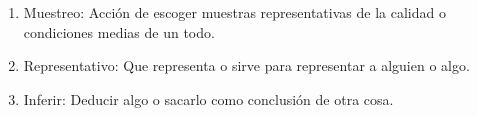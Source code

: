 \begin{enumerate}
    \item Muestreo: Acción de escoger muestras representativas de la calidad o condiciones medias de un todo.
    \cite{westreicher_2021}


    \item Representativo: Que representa o sirve para representar a alguien o algo.
    \cite{representativo_definicion_babla_2024}

    \item Inferir: Deducir algo o sacarlo como conclusión de otra cosa.
    \cite{asale_rae_2023}

    


    

    

     

\end{enumerate}

